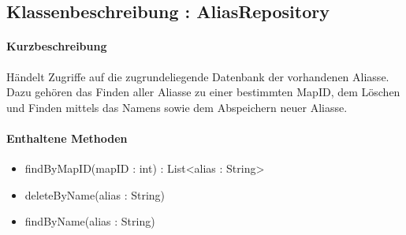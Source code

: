 \subsection{Klassenbeschreibung : AliasRepository}%
\paragraph*{Kurzbeschreibung}
Händelt Zugriffe auf die zugrundeliegende Datenbank der vorhandenen Aliasse.
Dazu gehören das Finden aller Aliasse zu einer bestimmten MapID, dem Löschen und Finden mittels das Namens sowie
dem Abspeichern neuer Aliasse.
\paragraph*{Enthaltene Methoden}
\begin{itemize}
    \item findByMapID(mapID : int) : List<alias : String>
    \item deleteByName(alias : String) 
    \item findByName(alias : String)
\end{itemize}


